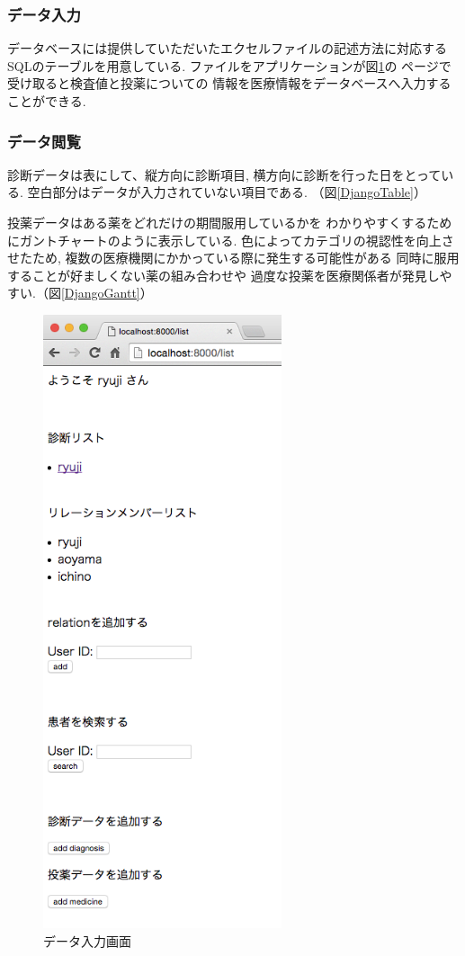   \subsubsection{データ入力}
    データベースには提供していただいたエクセルファイルの記述方法に対応する
    SQLのテーブルを用意している.
    ファイルをアプリケーションが図\ref{DjangoFileio}の
    ページで受け取ると検査値と投薬についての
    情報を医療情報をデータベースへ入力することができる.

  \subsubsection{データ閲覧}
    診断データは表にして、縦方向に診断項目,
    横方向に診断を行った日をとっている.
    空白部分はデータが入力されていない項目である.
    （図\ref{DjangoTable}）


    投薬データはある薬をどれだけの期間服用しているかを
    わかりやすくするためにガントチャートのように表示している.
    色によってカテゴリの視認性を向上させたため,
    複数の医療機関にかかっている際に発生する可能性がある
    同時に服用することが好ましくない薬の組み合わせや
    過度な投薬を医療関係者が発見しやすい.（図\ref{DjangoGantt}）



    \begin{figure}[htbp]
      \begin{center}
        \includegraphics[width=7cm, bb=0 0 330 851, clip]{./gazou/DjangoFileio2.png}
      \end{center}
      \caption{データ入力画面}
      \label{DjangoFileio}
    \end{figure}

